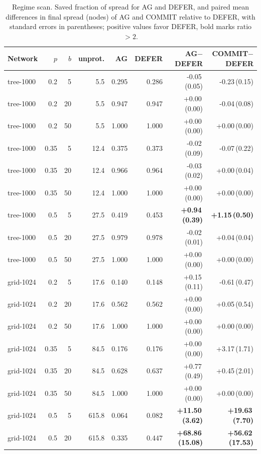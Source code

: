 \documentclass[ASNA,number]{USG}
\begin{document}
\begin{table}[h]
\centering
\caption{Regime scan. Saved fraction of spread for AG and DEFER, and paired mean
differences in final spread (nodes) of AG and COMMIT relative to DEFER, with
standard errors in parentheses; positive values favor DEFER, bold marks ratio
$>2$.\label{tab:regime}}
\footnotesize
\begin{tabular}{lrrrrrrr}
\hline
Network & $p$ & $b$ & unprot. & AG & DEFER & AG$-$DEFER & COMMIT$-$DEFER \\
\hline
tree-1000 & 0.2 & 5 & 5.5 & 0.295 & 0.286 & -0.05\,(0.05) & -0.23\,(0.15) \\
tree-1000 & 0.2 & 20 & 5.5 & 0.947 & 0.947 & +0.00\,(0.00) & -0.04\,(0.08) \\
tree-1000 & 0.2 & 50 & 5.5 & 1.000 & 1.000 & +0.00\,(0.00) & +0.00\,(0.00) \\
tree-1000 & 0.35 & 5 & 12.4 & 0.375 & 0.373 & -0.02\,(0.09) & -0.07\,(0.22) \\
tree-1000 & 0.35 & 20 & 12.4 & 0.966 & 0.964 & -0.03\,(0.02) & +0.00\,(0.04) \\
tree-1000 & 0.35 & 50 & 12.4 & 1.000 & 1.000 & +0.00\,(0.00) & +0.00\,(0.00) \\
tree-1000 & 0.5 & 5 & 27.5 & 0.419 & 0.453 & \textbf{+0.94\,(0.39)} & \textbf{+1.15\,(0.50)} \\
tree-1000 & 0.5 & 20 & 27.5 & 0.979 & 0.978 & -0.02\,(0.01) & +0.04\,(0.04) \\
tree-1000 & 0.5 & 50 & 27.5 & 1.000 & 1.000 & +0.00\,(0.00) & +0.00\,(0.00) \\
grid-1024 & 0.2 & 5 & 17.6 & 0.140 & 0.148 & +0.15\,(0.11) & -0.61\,(0.47) \\
grid-1024 & 0.2 & 20 & 17.6 & 0.562 & 0.562 & +0.00\,(0.00) & +0.05\,(0.54) \\
grid-1024 & 0.2 & 50 & 17.6 & 1.000 & 1.000 & +0.00\,(0.00) & +0.00\,(0.00) \\
grid-1024 & 0.35 & 5 & 84.5 & 0.176 & 0.176 & +0.00\,(0.00) & +3.17\,(1.71) \\
grid-1024 & 0.35 & 20 & 84.5 & 0.628 & 0.637 & +0.77\,(0.49) & +0.45\,(2.01) \\
grid-1024 & 0.35 & 50 & 84.5 & 1.000 & 1.000 & +0.00\,(0.00) & +0.00\,(0.00) \\
grid-1024 & 0.5 & 5 & 615.8 & 0.064 & 0.082 & \textbf{+11.50\,(3.62)} & \textbf{+19.63\,(7.70)} \\
grid-1024 & 0.5 & 20 & 615.8 & 0.335 & 0.447 & \textbf{+68.86\,(15.08)} & \textbf{+56.62\,(17.53)} \\

\end{tabular}
\end{table}
\end{document}
